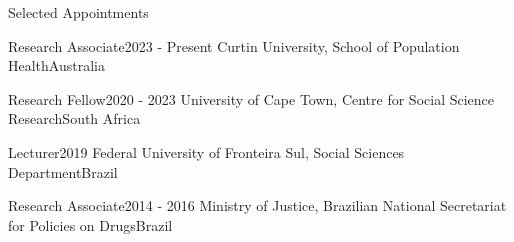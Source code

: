 \begin{rSection}{Selected Appointments}

\begin{rSubsection}
{Research Associate}{2023 - Present}
{Curtin University, School of Population Health}{Australia}\par
\end{rSubsection}

\begin{rSubsection}
{Research Fellow}{2020 - 2023}
{University of Cape Town, Centre for Social Science Research}{South Africa}\par
\end{rSubsection}

\begin{rSubsection}
{Lecturer}{2019}
{Federal University of Fronteira Sul, Social Sciences Department}{Brazil}\par
\end{rSubsection}

\begin{rSubsection}
{Research Associate}{2014 - 2016}
{Ministry of Justice, Brazilian National Secretariat for Policies on Drugs}{Brazil}\par
\end{rSubsection}

\end{rSection}